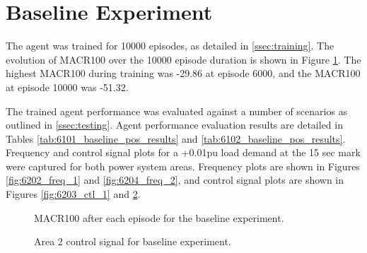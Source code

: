 \section{Baseline Experiment}
The agent was trained for 10000 episodes, as detailed in \textsection \ref{ssec:training}. The evolution of MACR100 over the 10000 episode duration is shown in Figure \ref{fig:6201_average_reward}. The highest MACR100 during training was -29.86 at episode 6000, and the MACR100 at episode 10000 was -51.32.

The trained agent performance was evaluated against a number of scenarios as outlined in \textsection \ref{ssec:testing}. Agent performance evaluation results are detailed in Tables \ref{tab:6101_baseline_pos_results} and \ref{tab:6102_baseline_pos_results}. Frequency and control signal plots for a +0.01pu load demand at the 15 sec mark were captured for both power system areas. Frequency plots are shown in Figures \ref{fig:6202_freq_1} and \ref{fig:6204_freq_2}, and control signal plots are shown in Figures \ref{fig:6203_ctl_1} and \ref{fig:6205_ctl_2}.

\begin{figure}[h]
	\centering
	
	\caption{MACR100 after each episode for the baseline experiment.}
	\label{fig:6201_average_reward}
\end{figure}





\begin{figure}[h]
	\centering
	
	\vspace{-0.5cm}
	\caption[Experiment 1 Area 1 frequency]{Area 1 frequency response for baseline experiment.}\label{fig:6202_freq_1}
	
	\vspace{0.5cm}
	
	
	\vspace{-0.5cm}
	\caption[Experiment 1 Area 1 control signal]{Area 1 control signal for baseline experiment.}\label{fig:6203_ctl_1}
	
	\vspace{0.5cm}
	
	
	\vspace{-0.5cm}
	\caption[Experiment 1 Area 2 frequency]{Area 2 frequency response for baseline experiment.}\label{fig:6204_freq_2}
	
	\vspace{0.5cm}
		
	
	\vspace{-0.5cm}
	\caption[Experiment 1 Area 2 control signal]{Area 2 control signal for baseline experiment.}\label{fig:6205_ctl_2}
\end{figure}